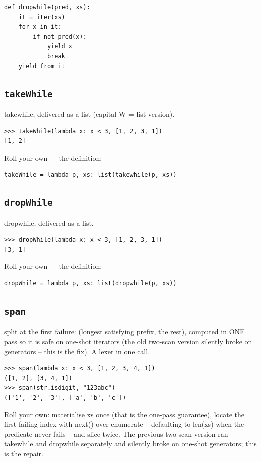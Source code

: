 \documentclass[10pt,letterpaper]{book}
\begin{document}
\begin{lstlisting}[style=ex]
def dropwhile(pred, xs):
    it = iter(xs)
    for x in it:
        if not pred(x):
            yield x
            break
    yield from it
\end{lstlisting}
\subsection{\texttt{takeWhile}}\label{def:takeWhile}
takewhile, delivered as a list (capital W = list version).
\begin{lstlisting}[style=ex]
>>> takeWhile(lambda x: x < 3, [1, 2, 3, 1])
[1, 2]
\end{lstlisting}

Roll your own --- the definition:

\begin{lstlisting}[style=ex]
takeWhile = lambda p, xs: list(takewhile(p, xs))
\end{lstlisting}
\subsection{\texttt{dropWhile}}\label{def:dropWhile}
dropwhile, delivered as a list.
\begin{lstlisting}[style=ex]
>>> dropWhile(lambda x: x < 3, [1, 2, 3, 1])
[3, 1]
\end{lstlisting}

Roll your own --- the definition:

\begin{lstlisting}[style=ex]
dropWhile = lambda p, xs: list(dropwhile(p, xs))
\end{lstlisting}
\subsection{\texttt{span}}\label{def:span}
split at the first failure: (longest satisfying prefix, the rest), computed in ONE pass so it is safe on one-shot iterators (the old two-scan version silently broke on generators -- this is the fix). A lexer in one call.
\begin{lstlisting}[style=ex]
>>> span(lambda x: x < 3, [1, 2, 3, 4, 1])
([1, 2], [3, 4, 1])
>>> span(str.isdigit, "123abc")
(['1', '2', '3'], ['a', 'b', 'c'])
\end{lstlisting}

Roll your own: materialise xs once (that is the one-pass guarantee), locate the first failing index with next() over enumerate -- defaulting to len(xs) when the predicate never fails -- and slice twice. The previous two-scan version ran takewhile and dropwhile separately and silently broke on one-shot generators; this is the repair.
\end{document}
